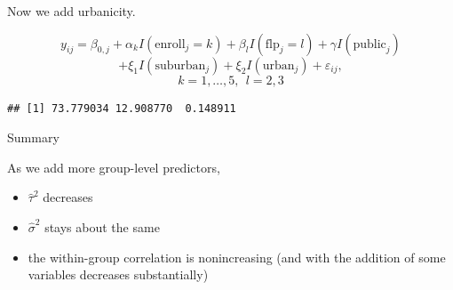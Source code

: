\documentclass[ignorenonframetext,]{beamer}
\newenvironment{Shaded}{\begin{snugshade}}{\end{snugshade}}
\newcommand{\KeywordTok}[1]{\textcolor[rgb]{0.13,0.29,0.53}{\textbf{#1}}}
\newcommand{\DataTypeTok}[1]{\textcolor[rgb]{0.13,0.29,0.53}{#1}}
\newcommand{\DecValTok}[1]{\textcolor[rgb]{0.00,0.00,0.81}{#1}}
\newcommand{\CommentTok}[1]{\textcolor[rgb]{0.56,0.35,0.01}{\textit{#1}}}
\newcommand{\OtherTok}[1]{\textcolor[rgb]{0.56,0.35,0.01}{#1}}
\newcommand{\OperatorTok}[1]{\textcolor[rgb]{0.81,0.36,0.00}{\textbf{#1}}}
\newcommand{\NormalTok}[1]{#1}
\providecommand{\tightlist}{%
  \setlength{\itemsep}{0pt}\setlength{\parskip}{0pt}}
\begin{document}
\begin{frame}[fragile]{}

Now we add urbanicity.

\[y_{ij}=\beta_{0,j}+\alpha_{k}I(\text{enroll}_j=k)+\beta_{l}I(\text{flp}_j=l)+\gamma I(\text{public}_j)\]
\[+\xi_1I(\text{suburban}_j)+\xi_2I(\text{urban}_j)+ \varepsilon_{ij},\]
\[k=1,\ldots,5, ~~ l=2,3\]

\begin{Shaded}
\end{Shaded}

\begin{verbatim}
## [1] 73.779034 12.908770  0.148911
\end{verbatim}

\end{frame}

\begin{frame}{Summary}

As we add more group-level predictors,

\begin{itemize}
\tightlist
\item
  \(\widehat{\tau}^2\) decreases
\item
  \(\widehat{\sigma}^2\) stays about the same
\item
  the within-group correlation is nonincreasing (and with the addition
  of some variables decreases substantially)
\end{itemize}

\end{frame}
\end{document}
